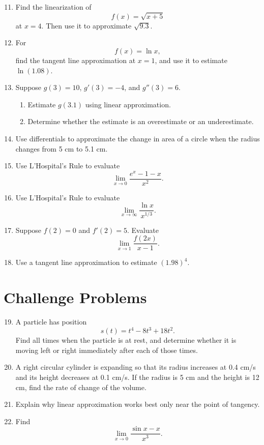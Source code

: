 \documentclass[11pt]{article}
\begin{document}
\begin{enumerate}
    \setcounter{enumi}{10}

    \item Find the linearization of
    \[
    f(x)=\sqrt{x+5}
    \]
    at \(x=4\). Then use it to approximate \(\sqrt{9.3}\).

    \item For
    \[
    f(x)=\ln x,
    \]
    find the tangent line approximation at \(x=1\), and use it to estimate \(\ln(1.08)\).

    \item Suppose \(g(3)=10\), \(g'(3)=-4\), and \(g''(3)=6\).
    \begin{enumerate}
        \item Estimate \(g(3.1)\) using linear approximation.
        \item Determine whether the estimate is an overestimate or an underestimate.
    \end{enumerate}

    \item Use differentials to approximate the change in area of a circle when the radius changes from 5 cm to 5.1 cm.

    \item Use L'Hospital's Rule to evaluate
    \[
    \lim_{x\to 0}\frac{e^x-1-x}{x^2}.
    \]

    \item Use L'Hospital's Rule to evaluate
    \[
    \lim_{x\to \infty}\frac{\ln x}{x^{1/3}}.
    \]

    \item Suppose \(f(2)=0\) and \(f'(2)=5\). Evaluate
    \[
    \lim_{x\to 1}\frac{f(2x)}{x-1}.
    \]

    \item Use a tangent line approximation to estimate \((1.98)^4\).
\end{enumerate}

\bigskip
\newpage
\section*{Challenge Problems}

\begin{enumerate}
    \setcounter{enumi}{18}

    \item A particle has position
    \[
    s(t)=t^4-8t^3+18t^2.
    \]
    Find all times when the particle is at rest, and determine whether it is moving left or right immediately after each of those times.

    \item A right circular cylinder is expanding so that its radius increases at 0.4 cm/s and its height decreases at 0.1 cm/s.
    If the radius is 5 cm and the height is 12 cm, find the rate of change of the volume.

    \item Explain why linear approximation works best only near the point of tangency.

    \item Find
    \[
    \lim_{x\to 0}\frac{\sin x - x}{x^3}.
    \]
\end{enumerate}
\end{document}
